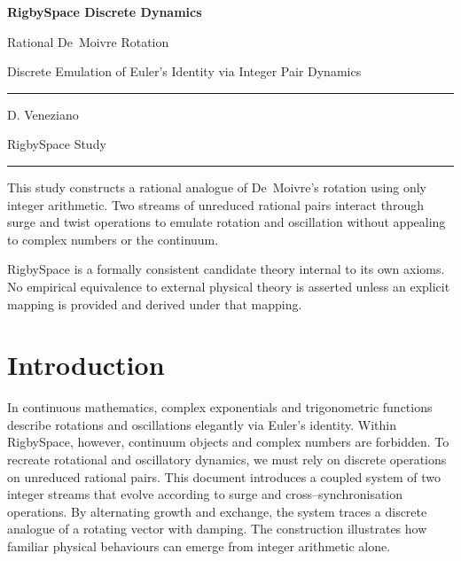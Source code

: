 \documentclass[11pt, letterpaper]{article}
\theoremstyle{definition}
\theoremstyle{plain}
\begin{document}
\begin{titlepage}
  \centering
  \vspace*{2cm}
  {\Huge\bfseries\color{RSblue} RigbySpace Discrete Dynamics\par}
  \vspace{0.5cm}
  {\LARGE Rational De Moivre Rotation\par}
  \vspace{0.5cm}
  {\large Discrete Emulation of Euler's Identity via Integer Pair Dynamics\par}
  \vspace{2cm}
  \rule{0.6\textwidth}{0.4pt}\par
  \vspace{1cm}
  {\large D. Veneziano\par}
  \vspace{0.8cm}
  {\normalsize RigbySpace Study\par}
  \vspace{1.5cm}
  \rule{0.6\textwidth}{0.4pt}\par
  \vspace{0.5cm}
  {\small This study constructs a rational analogue of De Moivre's rotation
  using only integer arithmetic.  Two streams of unreduced rational pairs
  interact through surge and twist operations to emulate rotation and
  oscillation without appealing to complex numbers or the continuum.\par}
  \vfill
  {\small\color{RSgray}
  RigbySpace is a formally consistent candidate theory internal to its own
  axioms.  No empirical equivalence to external physical theory is asserted
  unless an explicit mapping is provided and derived under that mapping.\par}
\end{titlepage}

\tableofcontents
\newpage

\section{Introduction}

In continuous mathematics, complex exponentials and trigonometric functions
describe rotations and oscillations elegantly via Euler's identity.  Within
RigbySpace, however, continuum objects and complex numbers are forbidden.  To
recreate rotational and oscillatory dynamics, we must rely on discrete
operations on unreduced rational pairs.  This document introduces a coupled
system of two integer streams that evolve according to surge and
cross–synchronisation operations.  By alternating growth and exchange, the
system traces a discrete analogue of a rotating vector with damping.  The
construction illustrates how familiar physical behaviours can emerge from
integer arithmetic alone.
\end{document}
